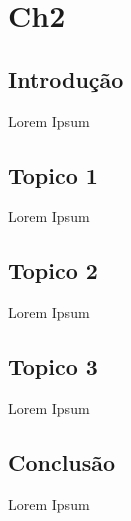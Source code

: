 \chapter{Ch2}
\label{chap:estado-da-arte}

\section{Introdução}
\label{chap2:sec:intro}

Lorem Ipsum

\section{Topico 1}
\label{chap2:sec:citacoes}

Lorem Ipsum

\section{Topico 2}
\label{chap2:sec:...}

Lorem Ipsum

\section{Topico 3}
\label{chap2:sec:concs}

Lorem Ipsum

\section{Conclusão}
\label{chap2:sec:concs}

Lorem Ipsum